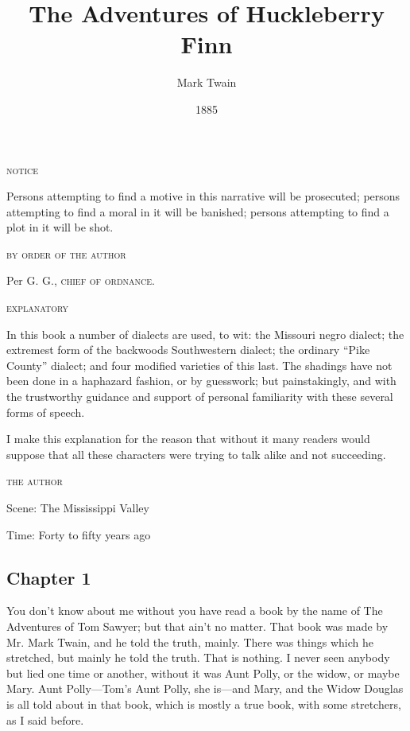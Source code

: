 \documentclass[10pt,a4paper]{article}
\begin{document}
\title{The Adventures of Huckleberry Finn}
\date{1885}
\author{Mark Twain}
\maketitle
    
\thispagestyle{plain}
\setcounter{page}{1}

\begin{center}
  \textsc{notice}
\end{center}

Persons attempting to find a motive in this narrative will be prosecuted; persons attempting to find a moral in it will be banished; persons attempting to find a plot in it will be shot.

\begin{flushright}
\textsc{by order of the author}

Per \textsc{G. G., chief of ordnance.}
\end{flushright}

\begin{center}
\textsc{explanatory}
\end{center}

In this book a number of dialects are used, to wit: the Missouri negro dialect; the extremest form of the backwoods Southwestern dialect; the ordinary “Pike County” dialect; and four modified varieties of this last. The shadings have not been done in a haphazard fashion, or by guesswork; but painstakingly, and with the trustworthy guidance and support of personal familiarity with these several forms of speech.

I make this explanation for the reason that without it many readers would suppose that all these characters were trying to talk alike and not succeeding.

\begin{flushright}
  \textsc{the author}
\end{flushright}

\vspace{2.5em}
\begin{center}
Scene: The Mississippi Valley

Time: Forty to fifty years ago
\end{center}
\vspace{1.4em}
\subsection{Chapter 1}
\linenumbers You don’t know about me without you have read a book by the name of The Adventures of Tom Sawyer; but that ain’t no matter. That book was made by Mr. Mark Twain, and he told the truth, mainly. There was things which he stretched, but mainly he told the truth. That is nothing. I never seen anybody but lied one time or another, without it was Aunt Polly, or the widow, or maybe Mary. Aunt Polly—Tom’s Aunt Polly, she is—and Mary, and the Widow Douglas is all told about in that book, which is mostly a true book, with some stretchers, as I said before.
\end{document}
